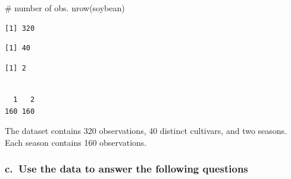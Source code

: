 \documentclass[
  letterpaper,
  DIV=11,
  numbers=noendperiod]{scrartcl}
\newenvironment{Shaded}{\begin{snugshade}}{\end{snugshade}}
\newcommand{\CommentTok}[1]{\textcolor[rgb]{0.37,0.37,0.37}{#1}}
\newcommand{\FunctionTok}[1]{\textcolor[rgb]{0.28,0.35,0.67}{#1}}
\newcommand{\NormalTok}[1]{\textcolor[rgb]{0.00,0.23,0.31}{#1}}
\newcommand{\SpecialCharTok}[1]{\textcolor[rgb]{0.37,0.37,0.37}{#1}}
\begin{document}
\begin{Shaded}
\begin{Highlighting}[]
\CommentTok{\# number of obs.}
\FunctionTok{nrow}\NormalTok{(soybean)}
\end{Highlighting}
\end{Shaded}

\begin{verbatim}
[1] 320
\end{verbatim}

\begin{Shaded}
\end{Shaded}

\begin{verbatim}
[1] 40
\end{verbatim}

\begin{Shaded}
\end{Shaded}

\begin{verbatim}
[1] 2
\end{verbatim}

\begin{Shaded}
\end{Shaded}

\begin{verbatim}

  1   2 
160 160 
\end{verbatim}

The dataset contains 320 observations, 40 distinct cultivars, and two
seasons. Each season contains 160 observations.

\subsubsection{c.~Use the data to answer the following
questions}\label{c.-use-the-data-to-answer-the-following-questions}
\end{document}
